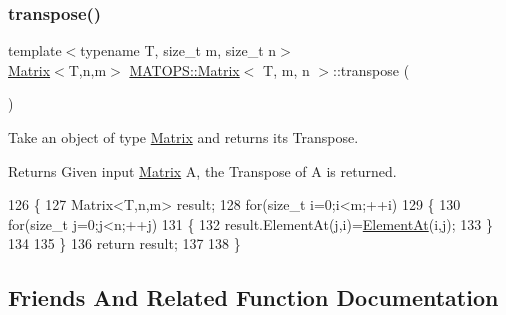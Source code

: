 \subsubsection{\texorpdfstring{transpose()}{transpose()}}
{\footnotesize\ttfamily template$<$typename T, size\+\_\+t m, size\+\_\+t n$>$ \\
\hyperlink{classMATOPS_1_1Matrix}{Matrix}$<$T,n,m$>$ \hyperlink{classMATOPS_1_1Matrix}{M\+A\+T\+O\+P\+S\+::\+Matrix}$<$ T, m, n $>$\+::transpose (\begin{DoxyParamCaption}{ }\end{DoxyParamCaption})\hspace{0.3cm}{\ttfamily [inline]}}



Take an object of type \hyperlink{classMATOPS_1_1Matrix}{Matrix} and returns its Transpose. 

\begin{DoxyReturn}{Returns}
Given input \hyperlink{classMATOPS_1_1Matrix}{Matrix} A, the Transpose of A is returned. 
\end{DoxyReturn}

\begin{DoxyCode}
126                         \{
127                                 Matrix<T,n,m> result;
128                                 \textcolor{keywordflow}{for}(\textcolor{keywordtype}{size\_t} i=0;i<m;++i)
129                                 \{
130                                         \textcolor{keywordflow}{for}(\textcolor{keywordtype}{size\_t} j=0;j<n;++j)
131                                         \{
132                                                 result.ElementAt(j,i)=\hyperlink{classMATOPS_1_1Matrix_a9eabd6b452bd01040c9ecaadc2ad6562}{ElementAt}(i,j);
133                                         \}
134 
135                                 \}
136                                 \textcolor{keywordflow}{return} result;
137 
138                         \}
\end{DoxyCode}


\subsection{Friends And Related Function Documentation}
\mbox{\label{classMATOPS_1_1Matrix_a71a095944f9f8db8ac68b41e3a409114}} 
